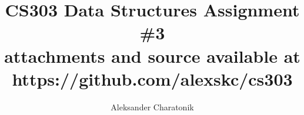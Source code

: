 \documentclass[12pt]{article}
\title{CS303 Data Structures Assignment \#3\\
\large attachments and source available at https://github.com/alexskc/cs303}
\author{Aleksander Charatonik}
\begin{document}
\maketitle

\section{}
\end{document}
